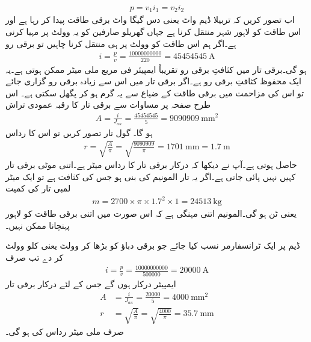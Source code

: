 %
\begin{align*}
p=v_1 i_1 = v_2 i_2
\end{align*}
اب تصور کریں کہ تربیلا ڈیم  واٹ یعنی دس گیگا واٹ  برقی طاقت پیدا کر رہا ہے اور اس طاقت کو لاہور شہر منتقل کرنا ہے جہاں گھریلو صارفین کو یہ  وولٹ پر مہیا کرنی ہے۔اگر ہم اس طاقت کو   وولٹ پر ہی منتقل کرنا چاہیں تو برقی رو
\begin{align*}
i=\frac{p}{v}=\frac{\num{10000000000}}{220}=\SI{45454545}{\ampere}
\end{align*}
ہو گی۔برقی تار میں کثافتِ برقی رو  تقریباً  ایمپیئر فی مربع ملی میٹر   ممکن ہوتی ہے۔یہ ایک محفوظ کثافتِ برقی رو ہے۔اگر برقی تار میں اس سے زیادہ برقی رو گزاری جائے تو اس کی مزاحمت میں برقی طاقت کے ضیاع سے یہ گرم ہو کر پگھل سکتی ہے۔ اس طرح صفحہ  پر  مساوات  سے برقی تار کا رقبہ عمودی تراش
\begin{align*}
A=\frac{i}{J_{au}}=\frac{45454545}{5}=\SI{9090909}{\milli\meter\squared}
\end{align*}
ہو گا۔ گول تار تصور کریں تو اس کا رداس
\begin{align*}
r=\sqrt{\frac{A}{\pi}}=\sqrt{\frac{9090909}{\pi}}=\SI{1701}{\milli\meter}=\SI{1.7}{\meter}
\end{align*}
حاصل ہوتی ہے۔آپ نے دیکھا کہ درکار برقی تار کا رداس  میٹر ہے۔اتنی موٹی برقی تار کہیں نہیں پائی جاتی ہے۔اگر یہ تار المونیم کی بنی ہو جس کی  کثافت   ہے تو ایک میٹر لمبی تار کی کمیت
\begin{align*}
m=2700 \times \pi \times 1.7^2 \times 1=\SI{24513}{\kilo\gram}
\end{align*}
یعنی  ٹن ہو گی۔المونیم اتنی مہنگی ہے کہ اس صورت میں اتنی برقی طاقت کو لاہور پہنچانا ممکن نہیں۔

ڈیم پر ایک ٹرانسفارمر نسب کیا جائے جو برقی دباؤ کو بڑھا کر   وولٹ یعنی  کلو وولٹ  کر دے تب صرف 
\begin{align*}
i=\frac{p}{v}=\frac{\num{10000000000}}{\num{500000}}=\SI{20000}{\ampere}
\end{align*}
ایمپیئر درکار ہوں گے جس کے لئے درکار برقی تار
\begin{align*}
A&=\frac{i}{J_{au}}=\frac{\num{20000}}{5}=\SI{4000}{\milli\meter\squared}\\
r&=\sqrt{\frac{A}{\pi}}=\sqrt{\frac{4000}{\pi}}=\SI{35.7}{\milli\meter}
\end{align*}
صرف  ملی میٹر رداس کی ہو گی۔
%

